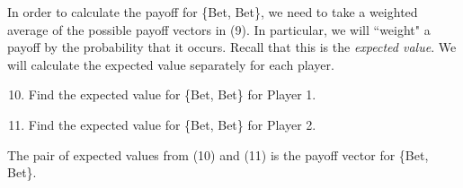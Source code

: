 In order to calculate the payoff for \{Bet, Bet\}, we need to take a weighted average of the possible payoff vectors in (9). In particular, we will ``weight" a payoff by the probability that it occurs. Recall that this is the {\it expected value}. We will calculate the expected value separately for each player. 
\vspace{.1in}

\begin{enumerate}
\setcounter{enumi}{9}

\item Find the expected value for \{Bet, Bet\} for Player 1.
\vspace{.1in}
\item Find the expected value for \{Bet, Bet\} for Player 2.
\vspace{.1in}
\end{enumerate}

\noindent
The pair of expected values from (10) and (11) is the payoff vector for \{Bet, Bet\}.
\vspace{.1in}

